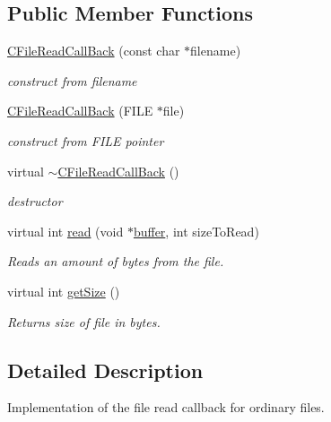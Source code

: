 \subsection*{Public Member Functions}
\begin{CompactItemize}
\item 
\hyperlink{classirr_1_1io_1_1_c_file_read_call_back_abc79875f8e09ff21d9c2a01f1907eca}{CFileReadCallBack} (const char $\ast$filename)
\begin{CompactList}\small\item\em construct from filename \item\end{CompactList}\item 
\hyperlink{classirr_1_1io_1_1_c_file_read_call_back_19c2fe29ebd44f95b33ef85e26cd7ca9}{CFileReadCallBack} (FILE $\ast$file)
\begin{CompactList}\small\item\em construct from FILE pointer \item\end{CompactList}\item 
virtual \hyperlink{classirr_1_1io_1_1_c_file_read_call_back_ff501b54688e10c2cd0418f982f52799}{$\sim$CFileReadCallBack} ()
\begin{CompactList}\small\item\em destructor \item\end{CompactList}\item 
virtual int \hyperlink{classirr_1_1io_1_1_c_file_read_call_back_b2d4c4e10cd2b03af1173fbc25f87741}{read} (void $\ast$\hyperlink{glext__bak_8h_c4fdb15bdbcd63430bab668b5419ed9f}{buffer}, int sizeToRead)
\begin{CompactList}\small\item\em Reads an amount of bytes from the file. \item\end{CompactList}\item 
virtual int \hyperlink{classirr_1_1io_1_1_c_file_read_call_back_c84d10241c07f1a8f744ffaad6683eef}{getSize} ()
\begin{CompactList}\small\item\em Returns size of file in bytes. \item\end{CompactList}\end{CompactItemize}


\subsection{Detailed Description}
Implementation of the file read callback for ordinary files. 

